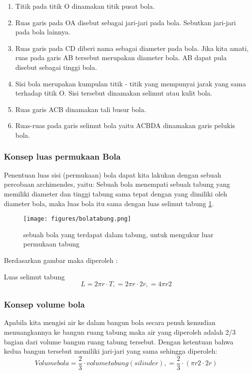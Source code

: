 \begin{enumerate}
\item Titik pada titik O dinamakan titik pusat bola.
\item Ruas garis pada OA disebut sebagai jari-jari pada bola. Sebutkan jari-jari pada bola lainnya.
\item Ruas garis pada CD diberi nama sebagai diameter pada bola. Jika kita amati, ruas pada garis AB tersebut merupakan diameter bola. AB dapat pula disebut sebagai tinggi bola.
\item Sisi bola merupakan kumpulan titik - titik yang mempunyai jarak yang sama terhadap titik O. Sisi tersebut dinamakan selimut atau kulit bola.
\item Ruas garis ACB dinamakan tali busur bola.
\item Ruas-ruas pada garis selimut bola yaitu ACBDA dinamakan garis pelukis bola.
\end{enumerate}
\subsubsection{Konsep luas permukaan Bola}
Penentuan luas sisi (permukaan) bola dapat kita lakukan dengan sebuah percobaan archimendes, yaitu:
Sebuah bola menempati sebuah tabung yang memiliki diameter dan tinggi tabung sama tepat dengan 
yang dimiliki oleh diameter bola, maka luas bola itu sama dengan luas selimut tabung \ref{bolatabung}.
\begin{figure}[ht]
    \centerline{\texttt{[image: figures/bolatabung.png]}}
    \caption{sebuah bola yang terdapat dalam tabung, untuk mengukur luar permukaan tabung}
    \label{bolatabung}
    \end{figure} 
Berdasarkan gambar maka diperoleh :

Luas selimut tabung 
\begin{equation}
		L	= 2 \pi r \cdot T,
			= 2\pi r \cdot 2r,
			= 4\pi r2
\end{equation}
            
\subsubsection{Konsep volume bola}
Apabila kita mengisi air ke dalam bangun bola secara penuh 
kemudian menuangkannya ke bangun ruang tabung maka air yang diperoleh adalah 2/3 bagian dari volume bangun ruang tabung tersebut. 
Dengan ketentuan bahwa kedua bangun tersebut memiliki jari-jari yang sama sehingga diperoleh:
\begin{equation}
Volume bola = \frac{2}{3} \cdot volume tabung(silinder),
            = \frac{2}{3} \cdot (\pi r2 \cdot 2r)
\end{equation}

